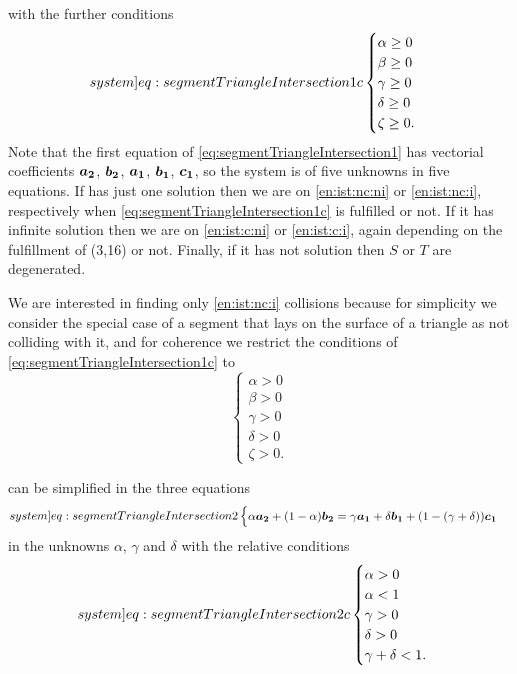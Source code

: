 \documentclass[dissertation.tex]{subfiles}
\begin{document}
with the further conditions
\begin{equation}\label[system]{eq:segmentTriangleIntersection1c}
  \begin{cases}
    \alpha \ge 0\\
    \beta \ge 0\\
    \gamma \ge 0\\
    \delta \ge 0\\
    \zeta \ge 0.
  \end{cases}
\end{equation}
Note that the first equation of
\cref{eq:segmentTriangleIntersection1} has vectorial coefficients
$\boldsymbol{a_2}$, $\boldsymbol{b_2}$, $\boldsymbol{a_1}$, $\boldsymbol{b_1}$, $\boldsymbol{c_1}$, so the
system is of five unknowns in five equations. If
 has just one solution then we are
on \cref{en:ist:nc:ni} or \cref{en:ist:nc:i}, respectively when
\cref{eq:segmentTriangleIntersection1c} is fulfilled or not. If it has
infinite
solution then we are on \cref{en:ist:c:ni} or \cref{en:ist:c:i}, again
depending on the fulfillment of (3,16) or not. Finally, if it has not
solution then $S$ or $T$ are degenerated.

We are interested in finding only \cref{en:ist:nc:i} collisions because for
simplicity we consider the special case of a segment that lays on the
surface of a triangle as not colliding with it, and for coherence we
restrict the conditions of \cref{eq:segmentTriangleIntersection1c} to
\begin{equation}
  \begin{cases}
    \alpha > 0\\
    \beta > 0\\
    \gamma > 0\\
    \delta > 0\\
    \zeta > 0.
  \end{cases}
\end{equation}

 can be simplified in the three
equations 
\begin{equation}\label[system]{eq:segmentTriangleIntersection2}
  \begin{cases}
    \alpha \ve{a_2} + (1-\alpha)\ve{b_2}=\gamma\ve{a_1}+\delta\ve{b_1}+(1-(\gamma+\delta))\ve{c_1} \\
  \end{cases}
\end{equation}
in the unknowns $\alpha$, $\gamma$ and $\delta$ with the relative conditions
\begin{equation}\label[system]{eq:segmentTriangleIntersection2c}
  \begin{cases}
    \alpha > 0\\
    \alpha < 1\\
    \gamma > 0\\
    \delta > 0\\
    \gamma+\delta<1.
  \end{cases}
\end{equation}
\end{document}
